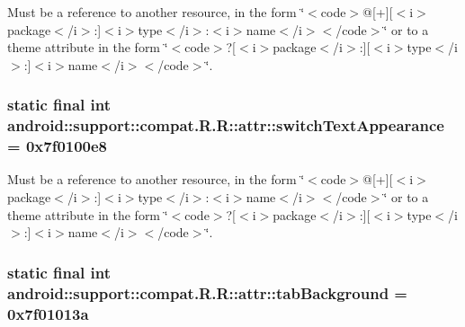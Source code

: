 Must be a reference to another resource, in the form \char`\"{}$<$code$>$@\mbox{[}+\mbox{]}\mbox{[}$<$i$>$package$<$/i$>$:\mbox{]}$<$i$>$type$<$/i$>$:$<$i$>$name$<$/i$>$$<$/code$>$\char`\"{} or to a theme attribute in the form \char`\"{}$<$code$>$?\mbox{[}$<$i$>$package$<$/i$>$:\mbox{]}\mbox{[}$<$i$>$type$<$/i$>$:\mbox{]}$<$i$>$name$<$/i$>$$<$/code$>$\char`\"{}. \hypertarget{classandroid_1_1support_1_1compat_1_1_r_1_1attr_eb295fa5474254818f626b108812bd9d}{
\subsubsection[{switchTextAppearance}]{\setlength{\rightskip}{0pt plus 5cm}static final int android::support::compat.R.R::attr::switchTextAppearance = 0x7f0100e8}}
\label{classandroid_1_1support_1_1compat_1_1_r_1_1attr_eb295fa5474254818f626b108812bd9d}


Must be a reference to another resource, in the form \char`\"{}$<$code$>$@\mbox{[}+\mbox{]}\mbox{[}$<$i$>$package$<$/i$>$:\mbox{]}$<$i$>$type$<$/i$>$:$<$i$>$name$<$/i$>$$<$/code$>$\char`\"{} or to a theme attribute in the form \char`\"{}$<$code$>$?\mbox{[}$<$i$>$package$<$/i$>$:\mbox{]}\mbox{[}$<$i$>$type$<$/i$>$:\mbox{]}$<$i$>$name$<$/i$>$$<$/code$>$\char`\"{}. \hypertarget{classandroid_1_1support_1_1compat_1_1_r_1_1attr_fc7482219d0e489b42674432e833db08}{
\subsubsection[{tabBackground}]{\setlength{\rightskip}{0pt plus 5cm}static final int android::support::compat.R.R::attr::tabBackground = 0x7f01013a}}
\label{classandroid_1_1support_1_1compat_1_1_r_1_1attr_fc7482219d0e489b42674432e833db08}


